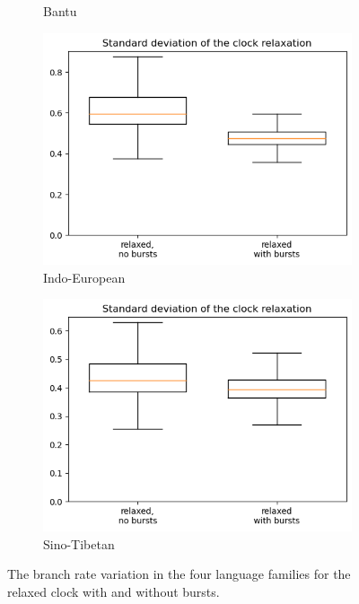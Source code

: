 \documentclass[a4paper]{article}
\begin{document}
\begin{figure}[h]
\begin{subfigure}{0.4\textwidth}
    \caption{Bantu}
    \label{fig:rate_variation:bantu}
  \end{subfigure}
  \begin{subfigure}{0.4\textwidth}
    \includegraphics[width=\textwidth]{supplement/analysis/indoeuropean_clockrates.png}
    \caption{Indo-European}
    \label{fig:rate_variation:indoeuropean}
  \end{subfigure}
  \begin{subfigure}{0.4\textwidth}
    \includegraphics[width=\textwidth]{supplement/analysis/sinotibetan_clockrates.png}
    \caption{Sino-Tibetan}
    \label{fig:rate_variation:sinotibetan}
  \end{subfigure}
  
  \caption{The branch rate variation in the four language families for the relaxed clock with and without bursts.}
  \label{fig:rate_variation}
\end{figure}
\end{document}
